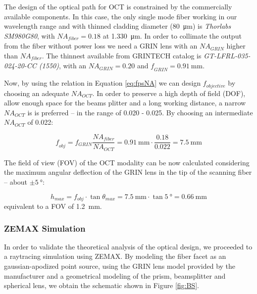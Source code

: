 The design of the optical path for OCT is constrained by the commercially available components. In this case, the only single mode fiber working in our wavelength range and with thinned cladding diameter (\SI{80}{\micro\meter}) is \textit{Thorlabs SM980G80}, with $\mathit{NA_{fiber}} = 0.18$ at \SI{1.330}{\micro\meter}. In order to collimate the output from the fiber without power loss we need a GRIN lens with an $\mathit{NA_{GRIN}}$ higher than $\mathit{NA_{fiber}}$. The thinnest available from GRINTECH catalog is \textit{GT-LFRL-035-024-20-CC (1550)}, with an $\mathit{NA_{GRIN}} = 0.20$ and $\mathit{f_{GRIN}} = \SI{0.91}{\milli\meter}$. 

Now, by using the relation in Equation \ref{eq:fpsNA} we can design $f_{objective}$ by choosing an adequate $\mathit{NA_{OCT}}$. In order to preserve a high depth of field (DOF), allow enough space for the beams plitter and a long working distance, a narrow $\mathit{NA_{OCT}}$ is is preferred -- in the range of 0.020 - 0.025. By choosing an intermediate $\mathit{NA_{OCT}}$ of 0.022:

\begin{equation}
\mathit{f_{obj}} = f_{GRIN} \frac{\mathit{NA_{fiber}}}{\mathit{NA_{OCT}} } = \SI{0.91}{\milli\meter} \cdot \frac{0.18}{0.022} = \SI{7.5}{\milli\meter}
\end{equation}

The field of view (FOV) of the OCT modality can be now calculated considering the maximum angular deflection of the GRIN lens in the tip of the scanning fiber -- about $\pm \SI{5}{\degree}$: 

\begin{equation}
h_{max} = f_{obj}\cdot \tan  \theta_{max} = \SI{7.5}{\milli\meter} \cdot \tan \SI{5}{\degree} = \SI{0.66}{\milli\meter}
\end{equation}
\noindent
equivalent to a FOV of \SI{1.2}{\milli\meter}.



\subsubsection{ZEMAX Simulation}

In order to validate the theoretical analysis of the optical design, we proceeded to a raytracing simulation using ZEMAX. By modeling the fiber facet as an gaussian-apodized point source, using the GRIN lens model provided by the manufacturer and a geometrical modeling of the prism, beamsplitter and spherical lens, we obtain the schematic shown in Figure \ref{fig:BS}. 

